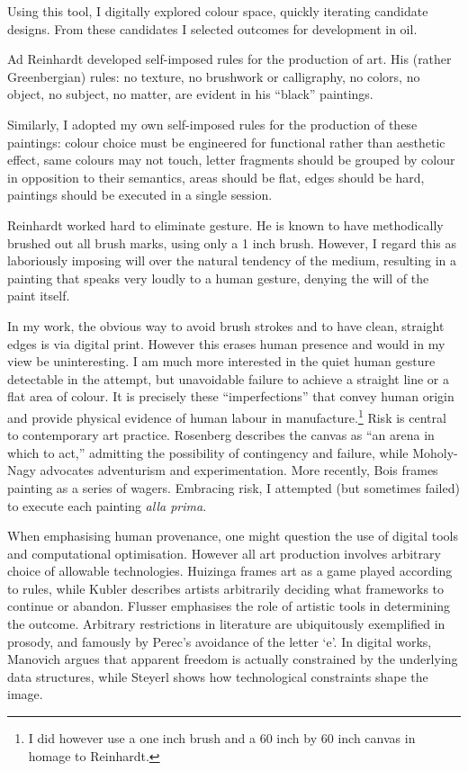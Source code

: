 \documentclass[12pt]{article}
\begin{document}
Using this tool, I digitally explored colour space, quickly iterating
candidate designs. From these candidates I selected outcomes for
development in oil.

Ad Reinhardt developed self-imposed rules for the production of
art.\cite[p. 203-7]{artasart} His (rather Greenbergian) rules: no
texture, no brushwork or calligraphy, no colors, no object, no
subject, no matter, are evident in his ``black'' paintings.

Similarly, I adopted my own self-imposed rules for the production of
these paintings: colour choice must be engineered for functional
rather than aesthetic effect, same colours may not touch, letter
fragments should be grouped by colour in opposition to their
semantics, areas should be flat, edges should be hard, paintings
should be executed in a single session.

Reinhardt worked hard to eliminate gesture. He is known to have
methodically brushed out all brush marks, using only a 1 inch
brush.\cite[p. 206]{artasart} However, I regard this as 
laboriously imposing will over the natural tendency of the medium,
resulting in a painting that speaks very loudly to a human gesture,
denying the will of the paint itself.

In my work, the obvious way to avoid brush strokes and to have clean,
straight edges is via digital print. However this erases human
presence and would in my view be uninteresting. I am much more
interested in the quiet human gesture detectable in the attempt, but
unavoidable failure to achieve a straight line or a flat area of
colour. It is precisely these ``imperfections'' that convey human
origin and provide physical evidence of human labour in
manufacture.\footnote{I did however use a one inch brush and a 60 inch
  by 60 inch canvas in homage to Reinhardt.} Risk is central to
contemporary art practice. Rosenberg describes the canvas as ``an
arena in which to act,''\cite[p. 22]{rosenberg1952american} admitting
the possibility of contingency and failure, while Moholy-Nagy
advocates adventurism and
experimentation\cite[p. 274-6]{moholy1947vision}. More recently, Bois
frames painting as a series of wagers.\cite[p. 229]{bois1990painting}
Embracing risk, I attempted (but sometimes failed) to execute each
painting \emph{alla prima}.

When emphasising human provenance, one might question the use of
digital tools and computational optimisation. However all art
production involves arbitrary choice of allowable
technologies. Huizinga frames art as a game played according to
rules,\cite{huizinga1938homo} while Kubler describes artists
arbitrarily deciding what frameworks to continue or
abandon.\cite{kubler1962shape} Flusser emphasises the role of artistic
tools in determining the outcome.\cite{flusser2000towards} Arbitrary
restrictions in literature are ubiquitously exemplified in prosody,
and famously by Perec's avoidance of the letter
`e'.\cite{perec1969disparition} In digital works, Manovich argues that apparent freedom is actually constrained by the underlying data structures\cite{manovich2001language}, while Steyerl shows how technological constraints shape the image\cite{steyerl2009poorimage}.
\end{document}
